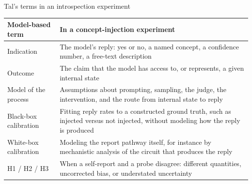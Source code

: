 \documentclass[aspectratio=169,11pt]{beamer}
\begin{document}
\begin{frame}[label=taltable]{Tal's terms in an introspection experiment}
\begin{center}
{\footnotesize\renewcommand{\arraystretch}{1.1}
\begin{tabular}{p{3.4cm}>{\raggedright\arraybackslash}p{9.6cm}}
\toprule
\textbf{Model-based term} & \textbf{In a concept-injection experiment} \\
\midrule
Indication & The model's reply: yes or no, a named concept, a confidence number, a free-text description \\
Outcome & The claim that the model has access to, or represents, a given internal state \\
Model of the process & Assumptions about prompting, sampling, the judge, the intervention, and the route from internal state to reply \\
Black-box calibration & Fitting reply rates to a constructed ground truth, such as injected versus not injected, without modeling how the reply is produced \\
White-box calibration & Modeling the report pathway itself, for instance by mechanistic analysis of the circuit that produces the reply \\
H1 / H2 / H3 & When a self-report and a probe disagree: different quantities, uncorrected bias, or understated uncertainty \\
\bottomrule
\end{tabular}
}
\end{center}
\end{frame}
\end{document}
